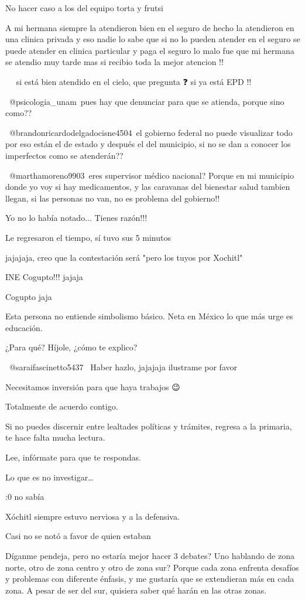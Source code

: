 No hacer caso a los del equipo torta y frutsi

A mi hermana siempre la atendieron bien en el seguro de hecho la atendieron en una clinica privada y eso nadie lo sabe que si no lo pueden atender en el seguro se puede atender en clinica particular y paga el seguro lo malo fue que mi hermana  se atendio muy tarde mas si recibio toda la mejor atencion !!

​   si está bien atendido en el cielo, que pregunta ❓ si ya está EPD !!

​ @psicologia_unam pues hay que denunciar para que se atienda, porque sino como??

​ @brandonricardodelgadocisne4504 el gobierno federal no puede visualizar todo por eso están el de estado y después el del municipio, si no se dan a conocer los imperfectos como se atenderán??

​ @marthamoreno9903 eres supervisor médico nacional? Porque en mi municipio donde yo voy si hay medicamentos, y las caravanas del bienestar salud tambien llegan, si las personas no van, no es problema del gobierno!! 🤷

Yo no lo había notado... Tienes razón!!!

Le regresaron el tiempo, sí tuvo sus 5 minutos

jajajaja, creo que la contestación será "pero los tuyos por Xochitl"

INE Cogupto!!! jajaja

Cogupto jaja

Esta persona no entiende simbolismo básico. Neta en México lo que más urge es educación.

¿Para qué? Híjole, ¿cómo te explico?

 @saraifascinetto5437  Haber hazlo, jajajaja  ilustrame por favor

Necesitamos inversión para que haya trabajos 😉

Totalmente de acuerdo contigo.

Si no puedes discernir entre lealtades políticas y trámites, regresa a la primaria, te hace falta mucha lectura.

Lee, infórmate para que te respondas.

Lo que es no investigar…

:0 no sabía

Xóchitl siempre estuvo nerviosa y a la defensiva.

Casi no se notó a favor de quien estaban

Díganme pendeja, pero no estaría mejor hacer 3 debates? Uno hablando de zona norte, otro de zona centro y otro de zona sur? Porque cada zona enfrenta desafíos y problemas con diferente énfasis, y me gustaría que se extendieran más en cada zona. A pesar de ser del sur, quisiera saber qué harán en las otras zonas.

